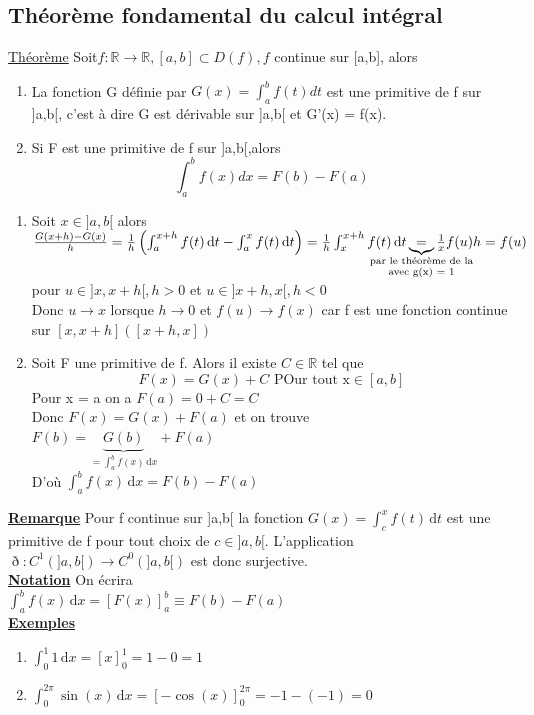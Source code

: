 \documentclass[12pt,a4paper]{article}
\newcommand{\evid}[1]{\textbf{\underline{#1}}}
\newcommand{\R}{\ensuremath{\mathbb{R}} }
\newcommand{\rtor}{\ensuremath{\R \to \R} }
\newcommand{\Theoreme}{\underline{Théorème} }
\newcommand{\intx}[3]{\ensuremath{\int_{#1}^{#2} #3 \, \mathrm dx}}
\newcommand{\intt}[3]{\ensuremath{\int_{#1}^{#2} #3 \, \mathrm dt}}
\begin{document}
{\subsection{Théorème fondamental du calcul intégral}
\begin{boite}
	\Theoreme Soit$f:\rtor, [a,b] \subset D(f), f$ continue sur [a,b], alors
	\begin{enumerate}
		\item La fonction G définie par $G(x) = \int_a^b f(t) dt$ est une primitive de f sur ]a,b[, c'est à dire G est dérivable sur ]a,b[ et G'(x) = f(x).
		\item Si F est une primitive de f sur ]a,b[,alors 
		\begin{equation}
			\int_a^b f(x) dx = F(b) - F(a)
		\end{equation}
			\end{enumerate}
\end{boite}
\begin{enumerate}[label = \roman*)]
	 \item Soit $x \in ]a,b[$ alors
$
	 	\frac{G(x+h) - G(x)}{h} = \frac{1}{h}\left(\intt{a}{x+h}{f(t)} - \intt{a}{x}{f(t)}\right) = \\
	 	\frac{1}{h}\intt{x}{x+h}{f(t)} \underbrace{=}_{\mathclap{\substack{\text{par le théorème de la}\\ \text{avec g(x) = 1}}}} \frac{1}{x} f(u) h = f(u)
$
	 pour $u \in ]x,x+h[, h > 0$ et $u \in ]x+h,x[, h < 0$\\
	 Donc $ u \to x$ lorsque $h \to 0$ et $f(u) \to f(x)$ car f est une fonction continue sur $[x,x+h] ([x+h,x])$
	 \item Soit F une primitive de f. Alors il existe $C \in \R$ tel que
	 \begin{equation}
	 	F(x) = G(x) + C \text{ POur tout x} \in [a,b]
	 \end{equation}
	 Pour x = a on a $F(a) = 0+C = C$\\
	 Donc $F(x) = G(x) + F(a)$ et on trouve \\
	 $F(b) = \underbrace{G(b)}_{=\intx{a}{b}{f(x)}} + F(a)$\\
	 D'où $\intx{a}{b}{f(x)} = F(b) - F(a)$
\end{enumerate} 
\evid{Remarque} Pour f continue sur ]a,b[ la fonction $G(x) = \intt{c}{x}{f(t)}$ est une primitive de f pour tout choix de $c \in ]a,b[$. L'application $\eth : C^1(]a,b[) \to C^0(]a,b[)$ est donc surjective.\\
\evid{Notation} On écrira\\
$\intx{a}{b}{f(x)} = \left[F(x)\right]_a^b \equiv F(b) - F(a)$\\
\evid{Exemples}\\
\begin{enumerate}[label=\arabic*)]
	\item $\intx{0}{1}{1} = \left[x\right]_0^1 = 1-0 = 1$
	\item $\intx{0}{2\pi}{\sin(x)} = \left[-\cos(x)\right]_0^{2\pi} = -1-(-1) = 0$
\end{enumerate}
\newpage
}
\end{document}
